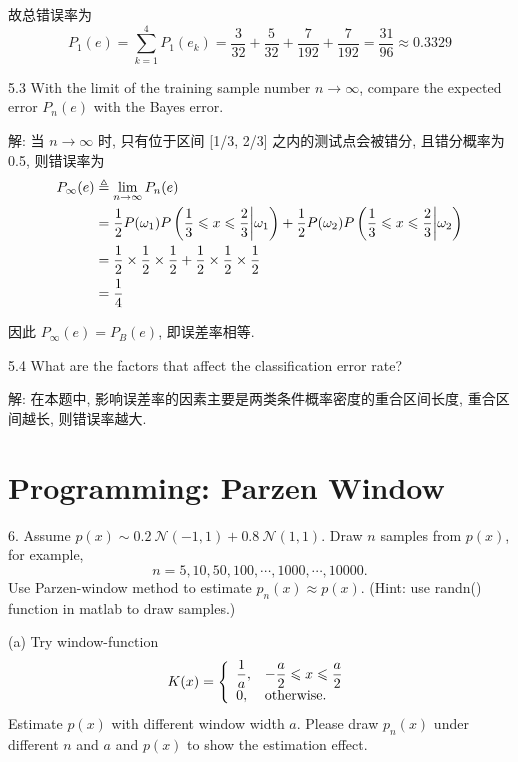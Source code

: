 \documentclass{article}
\begin{document}
故总错误率为
\begin{equation}
  P_1(e)=\sum_{k=1}^4P_1(e_k)=\frac{3}{32}+\frac{5}{32}+\frac{7}{192}+\frac{7}{192}=\frac{31}{96}\approx0.3329
\end{equation}

5.3 With the limit of the training sample number $n \rightarrow \infty$, compare the expected error $P_{n}(e)$ with the Bayes error.

解: 当 $n\to\infty$ 时, 只有位于区间 [1/3, 2/3] 之内的测试点会被错分, 且错分概率为 0.5, 则错误率为
\begin{equation}
  \begin{aligned}
    P_\infty(e)
    &\triangleq\lim_{n\to\infty}P_n(e)\\
    &=\frac{1}{2}P(\omega_1)P\left(\frac{1}{3}\leqslant x\leqslant\frac{2}{3}\bigg|\omega_1\right)+\frac{1}{2}P(\omega_2)P\left(\frac{1}{3}\leqslant x\leqslant\frac{2}{3}\bigg|\omega_2\right)\\
    &=\frac{1}{2}\times\frac{1}{2}\times\frac{1}{2}+\frac{1}{2}\times\frac{1}{2}\times\frac{1}{2}\\
    &=\frac{1}{4}\\
  \end{aligned}
\end{equation}

因此 $P_\infty(e)=P_B(e)$, 即误差率相等.

5.4 What are the factors that affect the classification error rate?

解: 在本题中, 影响误差率的因素主要是两类条件概率密度的重合区间长度, 重合区间越长, 则错误率越大.

\section*{Programming: Parzen Window}

6. Assume  $p(x) \sim 0.2~\mathcal{N}(-1,1)+0.8~\mathcal{N}(1,1)$.  Draw $n$ samples from $p(x)$, for example, 
\begin{equation}
  n=5,10,50,100,\cdots,1000,\cdots,10000.
\end{equation} 
Use Parzen-window method to estimate $p_n(x)\approx p(x)$. (Hint: use randn() function in matlab to draw samples.)

(a) Try window-function 
\begin{equation}
  K(x)=
  \left\{
    \begin{array}{ll}
      \dfrac{1}{a},&-\dfrac{a}{2}\leqslant x\leqslant \dfrac{a}{2} \\
      0, & \text{otherwise.}
    \end{array}
  \right.
\end{equation} 
Estimate $p(x)$ with different window width $a$. Please draw $p_n(x)$ under different $n$ and $a$ and $p(x)$ to show the estimation effect.
\end{document}
